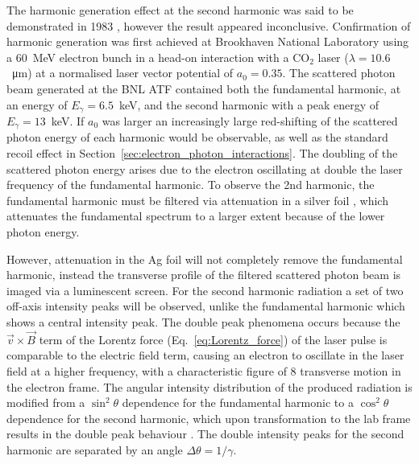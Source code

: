 \documentclass[../main.tex]{subfiles}
\begin{document}
The harmonic generation effect at the second harmonic was said to be demonstrated in 1983 \cite{englert1983second}, however the result appeared inconclusive. Confirmation of harmonic generation was first achieved at Brookhaven National Laboratory \cite{babzien2006observation,kumita2006observation} using a 60~\si{\mega\electronvolt} electron bunch in a head-on interaction with a CO$_{2}$ laser ($\lambda = 10.6$~\si{\micro\meter}) at a normalised laser vector potential of $a_{0} = 0.35$. The scattered photon beam generated at the BNL ATF contained both the fundamental harmonic, at an energy of $E_{\gamma} = 6.5$~\si{\kilo\electronvolt}, and the second harmonic with a peak energy of $E_{\gamma} = 13$~\si{\kilo\electronvolt}. If $a_{0}$ was larger an increasingly large red-shifting of the scattered photon energy of each harmonic \cite{kibble1965frequency,sakai2015observation} would be observable, as well as the standard recoil effect in Section~\ref{sec:electron_photon_interactions}. The doubling of the scattered photon energy arises due to the electron oscillating at double the laser frequency of the fundamental harmonic. To observe the 2nd harmonic, the fundamental harmonic must be filtered via attenuation in a silver foil \cite{babzien2006observation}, which attenuates the fundamental spectrum to a larger extent because of the lower photon energy.

However, attenuation in the Ag foil will not completely remove the fundamental harmonic, instead the transverse profile of the filtered scattered photon beam is imaged via a luminescent screen. For the second harmonic radiation a set of two off-axis intensity peaks will be observed, unlike the fundamental harmonic which shows a central intensity peak. The double peak phenomena occurs because the $\overrightarrow{v}\times\overrightarrow{B}$ term of the Lorentz force (Eq.~\ref{eq:Lorentz_force}) of the laser pulse is comparable to the electric field term, causing an electron to oscillate in the laser field at a higher frequency, with a characteristic figure of 8 transverse motion \cite{sarachik1970classical,jackson1999classical} in the electron frame. The angular intensity distribution of the produced radiation is modified from a $\sin^{2}\theta$ dependence for the fundamental harmonic to a $\cos^{2}\theta$ dependence for the second harmonic, which upon transformation to the lab frame results in the double peak behaviour \cite{babzien2006observation}. The double intensity peaks for the second harmonic are separated by an angle $\Delta\theta = 1/\gamma$.   
\end{document}
